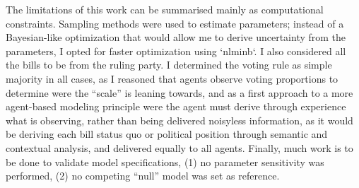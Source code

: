 \documentclass{article}
\begin{document}
	The limitations of this work can be summarised mainly as computational constraints. Sampling methods were used to estimate parameters; instead of a Bayesian-like optimization that would allow me to derive uncertainty from the parameters, I opted for faster optimization using `nlminb`. I also considered all the bills to be from the ruling party. I determined the voting rule as simple majority in all cases, as I reasoned that agents observe voting proportions to determine were the ``scale'' is leaning towards, and as a first approach to a more agent-based modeling principle were the agent must derive through experience what is observing, rather than being delivered noisyless information, as it would be deriving each bill status quo or political position through semantic and contextual analysis, and delivered equally to all agents. Finally, much work is to be done to validate model specifications, (1) no parameter sensitivity was performed, (2) no competing ``null'' model was set as reference.
	
	
\end{document}
